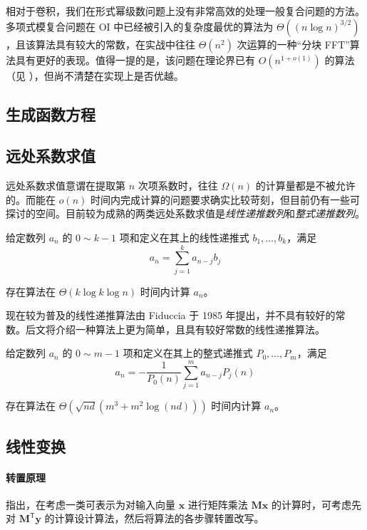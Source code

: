 相对于卷积，我们在形式幂级数问题上没有非常高效的处理一般复合问题的方法。多项式模复合问题在 OI 中已经被引入的复杂度最优的算法为 $\Theta((n\log n)^{3/2})$，且该算法具有较大的常数，在实战中往往 $\Theta(n^2)$ 次运算的一种“分块 FFT”算法具有更好的表现。值得一提的是，该问题在理论界已有 $O(n^{1+o(1)})$ 的算法（见 \cite{polyfact}），但尚不清楚在实现上是否优越。

\subsection{生成函数方程}

\subsection{远处系数求值}

远处系数求值意谓在提取第 $n$ 次项系数时，往往 $\Omega(n)$ 的计算量都是不被允许的。而能在 $o(n)$ 时间内完成计算的问题要求确实比较苛刻，但目前仍有一些可探讨的空间。目前较为成熟的两类远处系数求值是\emph{线性递推数列}和\emph{整式递推数列}。

\begin{theorem}给定数列 $a_n$ 的 $0\sim k-1$ 项和定义在其上的线性递推式 $b_1,\dots, b_k$，满足
$$ a_n = \sum_{j=1}^k a_{n-j} b_j $$

存在算法在 $\Theta(k\log k\log n)$ 时间内计算 $a_n$。
\end{theorem}

现在较为普及的线性递推算法由 Fiduccia 于 1985 年提出，并不具有较好的常数。后文将介绍一种算法上更为简单，且具有较好常数的线性递推算法。

\begin{theorem}给定数列 $a_n$ 的 $0\sim m-1$ 项和定义在其上的整式递推式 $P_0,\dots,P_m$，满足
$$ a_n = -\frac1{P_0(n)}\sum_{j=1}^m a_{n-j}P_j(n) $$

存在算法在 $\Theta \left(\sqrt{nd}\left(m^3+m^2\log(nd)\right)\right)$ 时间内计算 $a_n$。
\end{theorem}

\subsection{线性变换}

\paragraph{转置原理} \cite{tellegen} 指出，在考虑一类可表示为对输入向量 $\mathbf x$ 进行矩阵乘法 $\mathbf {Mx}$ 的计算时，可考虑先对 $\mathbf M^{\mathsf T}\mathbf y$ 的计算设计算法，然后将算法的各步骤转置改写。

